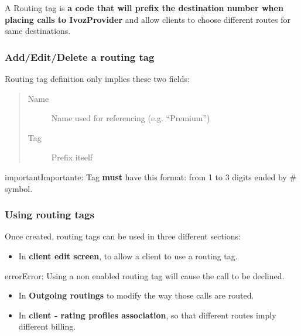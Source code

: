 \documentclass[letterpaper,10pt,spanish]{sphinxmanual}
\begin{document}
A Routing tag is \textbf{a code that will prefix the destination number when placing calls to IvozProvider} and allow clients
to choose different routes for same destinations.


\subsubsection{Add/Edit/Delete a routing tag}
\label{administration_portal/brand/routing/routing_tags:add-edit-delete-a-routing-tag}
Routing tag definition only implies these two fields:
\begin{quote}
\begin{description}
\item[{Name}] \leavevmode
Name used for referencing (e.g. ``Premium'')

\item[{Tag}] \leavevmode
Prefix itself

\end{description}
\end{quote}

\begin{notice}{important}{Importante:}
Tag \textbf{must} have this format: from 1 to 3 digits ended by \# symbol.
\end{notice}


\subsubsection{Using routing tags}
\label{administration_portal/brand/routing/routing_tags:using-routing-tags}
Once created, routing tags can be used in three different sections:
\begin{itemize}
\item {} 
In \textbf{client edit screen}, to allow a client to use a routing tag.

\end{itemize}

\begin{notice}{error}{Error:}
Using a non enabled routing tag will cause the call to be declined.
\end{notice}
\begin{itemize}
\item {} 
In \textbf{Outgoing routings} to modify the way those calls are routed.

\item {} 
In \textbf{client - rating profiles association}, so that different routes imply different billing.

\end{itemize}
\end{document}
